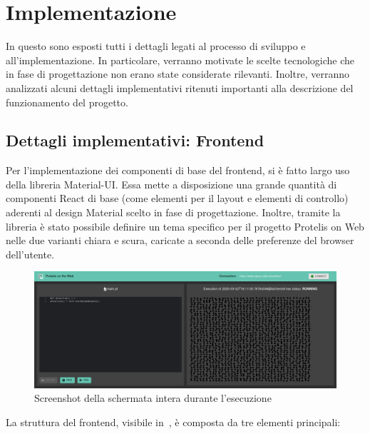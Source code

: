 \chapter{Implementazione}\label{ch:implementation}
  In questo  sono esposti tutti i dettagli legati al processo di sviluppo e all'implementazione.
  In particolare, verranno motivate le scelte tecnologiche che in fase di progettazione non erano state considerate rilevanti.
  Inoltre, verranno analizzati alcuni dettagli implementativi ritenuti importanti alla descrizione del funzionamento del progetto.

  

  \section{Dettagli implementativi: Frontend}

    Per l'implementazione dei componenti di base del frontend, si è fatto largo uso della libreria Material-UI\@.
    Essa mette a disposizione una grande quantità di componenti React di base (come elementi per il layout e elementi di controllo) aderenti al design Material scelto in fase di progettazione.
    Inoltre, tramite la libreria è stato possibile definire un tema specifico per il progetto Protelis on Web nelle due varianti chiara e scura, caricate a seconda delle preferenze del browser dell'utente.

    \begin{figure}[htbp]
      \centering
      \includegraphics[width=\textwidth]{res/screenshot/Screenshot_2020-03-02 Protelis on the Web(6).png} %
      \caption{Screenshot della schermata intera durante l'esecuzione}%
      \label{fig:screenshot:all}
    \end{figure}

    La struttura del frontend, visibile in~, è composta da tre elementi principali:

